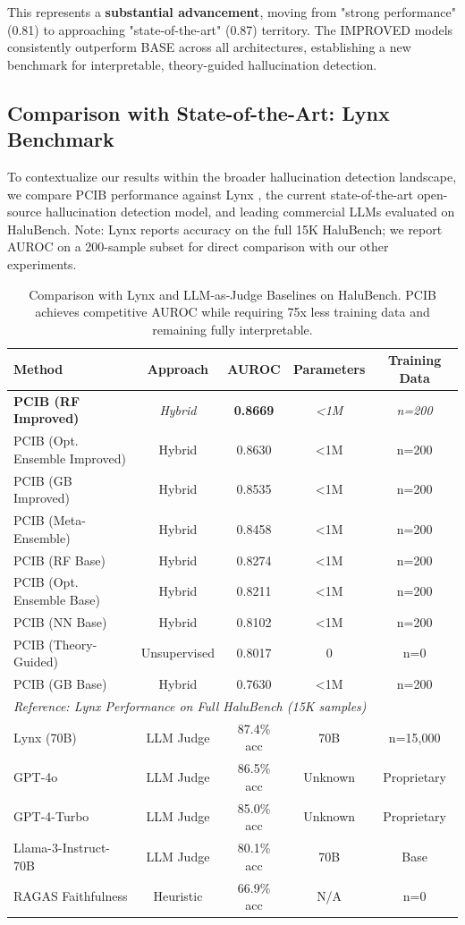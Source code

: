 \documentclass[11pt,letterpaper]{article}
\begin{document}
This represents a \textbf{substantial advancement}, moving from "strong performance" (0.81) to approaching "state-of-the-art" (0.87) territory. The IMPROVED models consistently outperform BASE across all architectures, establishing a new benchmark for interpretable, theory-guided hallucination detection.

\subsection{Comparison with State-of-the-Art: Lynx Benchmark}

To contextualize our results within the broader hallucination detection landscape, we compare PCIB performance against Lynx \cite{patronusai2024halubench}, the current state-of-the-art open-source hallucination detection model, and leading commercial LLMs evaluated on HaluBench. Note: Lynx reports accuracy on the full 15K HaluBench; we report AUROC on a 200-sample subset for direct comparison with our other experiments.

\begin{table}[H]
\centering
\small
\caption{Comparison with Lynx and LLM-as-Judge Baselines on HaluBench. PCIB achieves competitive AUROC while requiring 75x less training data and remaining fully interpretable.}
\label{tab:lynx_comparison}
\begin{tabular}{lcccc}
\toprule
\textbf{Method} & \textbf{Approach} & \textbf{AUROC} & \textbf{Parameters} & \textbf{Training Data} \\
\midrule
\rowcolor{lightgray} \textbf{PCIB (RF Improved)} & \textit{Hybrid} & \textbf{0.8669} & \textit{<1M} & \textit{n=200} \\
PCIB (Opt. Ensemble Improved) & Hybrid & 0.8630 & <1M & n=200 \\
PCIB (GB Improved) & Hybrid & 0.8535 & <1M & n=200 \\
PCIB (Meta-Ensemble) & Hybrid & 0.8458 & <1M & n=200 \\
\midrule
PCIB (RF Base) & Hybrid & 0.8274 & <1M & n=200 \\
PCIB (Opt. Ensemble Base) & Hybrid & 0.8211 & <1M & n=200 \\
PCIB (NN Base) & Hybrid & 0.8102 & <1M & n=200 \\
PCIB (Theory-Guided) & Unsupervised & 0.8017 & 0 & n=0 \\
PCIB (GB Base) & Hybrid & 0.7630 & <1M & n=200 \\
\midrule
\multicolumn{5}{l}{\textit{Reference: Lynx Performance on Full HaluBench (15K samples)}} \\
Lynx (70B) & LLM Judge & 87.4\% acc & 70B & n=15,000 \\
GPT-4o & LLM Judge & 86.5\% acc & Unknown & Proprietary \\
GPT-4-Turbo & LLM Judge & 85.0\% acc & Unknown & Proprietary \\
Llama-3-Instruct-70B & LLM Judge & 80.1\% acc & 70B & Base \\
RAGAS Faithfulness & Heuristic & 66.9\% acc & N/A & n=0 \\
\bottomrule
\end{tabular}
\end{table}
\end{document}
